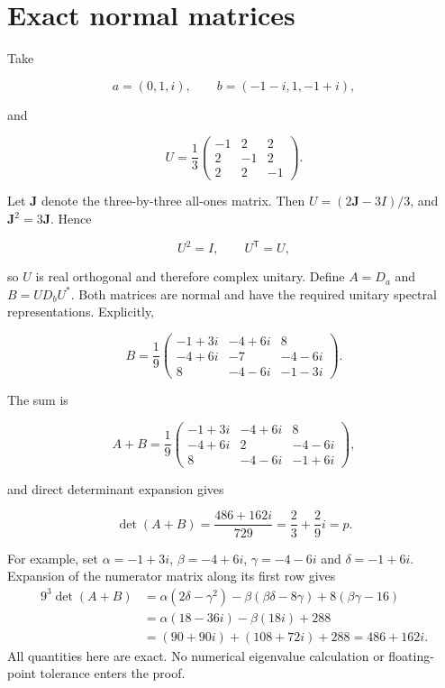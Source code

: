 \documentclass[11pt]{article}
\begin{document}
\section{Exact normal matrices}\label{exact-normal-matrices}

Take

\[
a=(0,1,i),\qquad b=(-1-i,1,-1+i),
\]

and

\[
U=\frac13
\begin{pmatrix}
-1&2&2\\
2&-1&2\\
2&2&-1
\end{pmatrix}.
\]

Let \(\mathbf{J}\) denote the three-by-three all-ones matrix. Then
\(U=(2\mathbf J-3I)/3\), and \(\mathbf J^2=3\mathbf J\). Hence

\[
U^2=I,\qquad U^{\mathsf T}=U,
\]

so \(U\) is real orthogonal and therefore complex unitary. Define
\(A=D_a\) and \(B=UD_bU^*\). Both matrices are normal and have the
required unitary spectral representations. Explicitly,

\[
B=\frac19
\begin{pmatrix}
-1+3i&-4+6i&8\\
-4+6i&-7&-4-6i\\
8&-4-6i&-1-3i
\end{pmatrix}.
\]

The sum is

\[
A+B=\frac19
\begin{pmatrix}
-1+3i&-4+6i&8\\
-4+6i&2&-4-6i\\
8&-4-6i&-1+6i
\end{pmatrix},
\]

and direct determinant expansion gives

\[
\det(A+B)=\frac{486+162i}{729}=\frac23+\frac29 i=p.
\]

For example, set $\alpha=-1+3i$, $\beta=-4+6i$, $\gamma=-4-6i$ and $\delta=-1+6i$. Expansion of the numerator matrix along its first row gives
\begin{align*}
 9^3\det(A+B)&=\alpha(2\delta-\gamma^2)-\beta(\beta\delta-8\gamma)+8(\beta\gamma-16)\\
 &=\alpha(18-36i)-\beta(18i)+288\\
 &=(90+90i)+(108+72i)+288=486+162i.
\end{align*}
All quantities here are exact. No numerical eigenvalue calculation or floating-point tolerance enters the proof.
\end{document}
